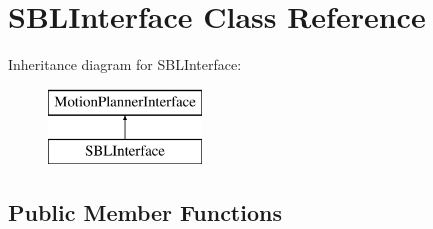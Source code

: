 \section{S\+B\+L\+Interface Class Reference}
\label{classSBLInterface}
Inheritance diagram for S\+B\+L\+Interface\+:\begin{figure}[H]
\begin{center}
\leavevmode
\includegraphics[height=2.000000cm]{classSBLInterface}
\end{center}
\end{figure}
\subsection*{Public Member Functions}
